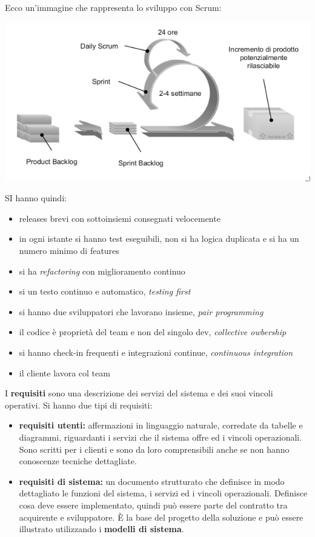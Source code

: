 \documentclass[a4paper,12pt, oneside]{book}
\begin{document}
Ecco un'immagine che rappresenta lo sviluppo con Scrum:
\begin{center}
	\includegraphics[scale=0.7]{img/ms11.png}
\end{center}
SI hanno quindi:
\begin{itemize}
	\item releases brevi con sottoinsiemi consegnati velocemente
	\item in ogni istante si hanno test eseguibili, non si ha logica duplicata e si ha un numero minimo di features
	\item si ha \textit{refactoring }con miglioramento continuo
	\item si un testo continuo e automatico, \textit{testing first}
	\item si hanno due sviluppatori che lavorano insieme, \textit{pair programming}
	\item il codice è proprietà del team e non del singolo dev, \textit{collective owbership}
	\item si hanno check-in frequenti e integrazioni continue, \textit{continuous integration}
	\item il cliente lavora col team
\end{itemize}
I \textbf{requisiti} sono una descrizione dei servizi del sistema e dei suoi vincoli operativi. Si hanno due tipi di requisiti:
\begin{itemize}
	\item \textbf{requisiti utenti:} affermazioni in linguaggio naturale, corredate da tabelle e diagrammi, riguardanti i servizi che il sistema offre ed i vincoli operazionali. Sono scritti per i clienti e sono da loro comprensibili anche se non	hanno conoscenze tecniche dettagliate.\\

	\item \textbf{requisiti di sistema:} un documento strutturato che definisce in modo dettagliato le funzioni del sistema, i servizi ed i vincoli operazionali. Definisce cosa deve essere implementato, quindi può essere parte del
	      contratto tra acquirente e sviluppatore. È la base del progetto della soluzione e può essere illustrato utilizzando i \textbf{modelli di sistema}.

\end{itemize}
\end{document}
